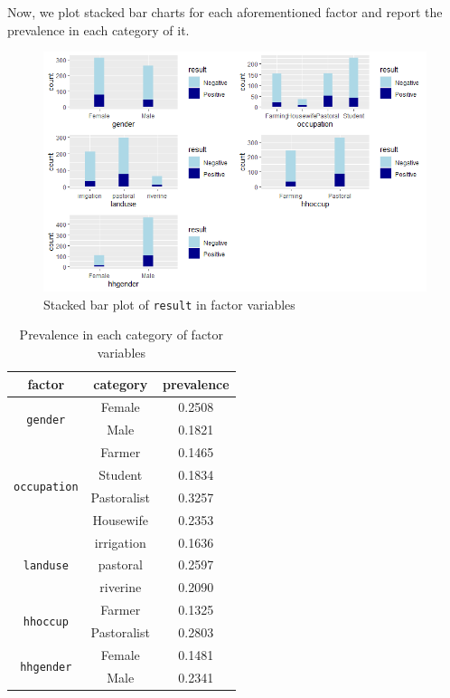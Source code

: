 \documentclass[11pt,twoside]{article}
\numberwithin{Theorem}{section}
\numberwithin{Definition}{section}
\numberwithin{Lemma}{section}
\numberwithin{Algorithm}{section}
\numberwithin{equation}{section}
\begin{document}
Now, we plot stacked bar charts for each aforementioned factor and report the prevalence in each category of it.

\begin{figure}[!h]
	\centering
	\includegraphics[width = \textwidth]{Images/factors.png}
	\caption{Stacked bar plot of \texttt{result} in factor variables}
	\label{fig:factor}
\end{figure}

\begin{table}
	\centering
	\begin{tabular}{|c|c|c|}
		\hline
		factor & category & prevalence \\
		\hline
		\multirow{2}{*}{\texttt{gender}} & Female & 0.2508 \\
		 & Male & 0.1821 \\
		\hline
		\multirow{4}{*}{\texttt{occupation}} & Farmer & 0.1465 \\
		 & Student & 0.1834 \\			
		 & Pastoralist & 0.3257 \\			
		 & Housewife & 0.2353 \\
		\hline
		\multirow{3}{*}{\texttt{landuse}} & irrigation & 0.1636 \\
		 & pastoral & 0.2597 \\
		 & riverine & 0.2090 \\
		\hline
		\multirow{2}{*}{\texttt{hhoccup}} & Farmer & 0.1325 \\
		 & Pastoralist & 0.2803 \\
		\hline
		\multirow{2}{*}{\texttt{hhgender}} & Female & 0.1481 \\
		 & Male & 0.2341 \\
		\hline
	\end{tabular}
	\caption{Prevalence in each category of factor variables}
	\label{tab:factor}
\end{table}
\end{document}
